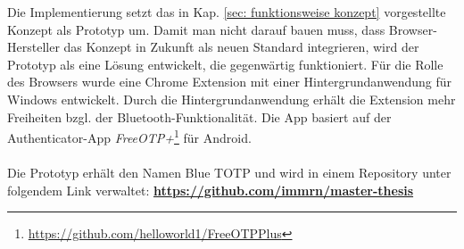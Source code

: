 Die Implementierung setzt das in Kap. \ref{sec: funktionsweise konzept} 
vorgestellte Konzept als Prototyp um. Damit man nicht darauf bauen muss, 
dass Browser-Hersteller das Konzept in Zukunft als neuen Standard integrieren, wird 
der Prototyp als eine Lösung entwickelt, die gegenwärtig funktioniert.
Für die Rolle 
des Browsers wurde eine Chrome Extension mit einer Hintergrundanwendung für 
Windows entwickelt. Durch die Hintergrundanwendung erhält die Extension mehr 
Freiheiten bzgl. der Bluetooth-Funktionalität. Die App basiert auf der 
Authenticator-App 
\textit{FreeOTP+}\footnote{\href{https://github.com/helloworld1/FreeOTPPlus}{https://github.com/helloworld1/FreeOTPPlus}} für Android.
\\\\
Die Prototyp erhält den Namen \glqq Blue TOTP\grqq{} und wird in einem 
Repository unter folgendem Link verwaltet: \textbf{\href{https://github.com/immrn/master-thesis}{https://github.com/immrn/master-thesis}}
